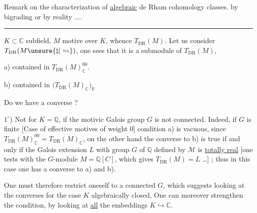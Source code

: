 Remark on the characterization of  \uline{algebraic} de Rham cohomology classes. by bigrading or by reality ....
\par\noindent\rule{\linewidth}{0.3pt}\par
$K\subset\mathbb C$ subfield, $M$ motive over $K$, whence $T_{\mathrm{DR}}(M)$. Let us consider $T_{\mathrm{DR}}(M\unsure{\natural|\leftrightharpoons})$, one sees that it is a submodule of $T_{\mathrm{DR}}(M)$, 
\par a) contained in $T_{\mathrm{DR}}(M)_{\mathbb C}^{00}$.
\par b)  contained in $\bigl(T_{\mathrm{DR}}(M)_{\mathbb C}\bigr)_{\mathbb R}$ 

Do we have a converse ?

$1^\circ$) Not for  $K=\mathbb Q$, if the motivic Galois group $G$  is not connected. Indeed, if $G$ is  finite [Case of effective motives of weight 0] condition a) is vacuous, since $T_{\mathrm{DR}}(M)_{\mathbb C}^{00}=T_{\mathrm{DR}}(M)_{\mathbb C}$,  on the other hand  the converse to b) is true if and only if the Galois extension $L$ with group $G$ of $\mathbb Q$ defined by $\mathcal M$ is \uline{totally real} [one tests with the $G$-module $M=\mathbb Q[C]$, which gives $T_{\mathrm{DR}}(M)=L$ \ldots] ; thus in this case one has a converse to a) and b).

One must therefore restrict oneself to a connected $G$, which suggests looking at the converses for the case $K$ algebraically closed,  One can moreover strengthen the condition, by looking at \uline{all} the embeddings $K\hookrightarrow\mathbb C$.

